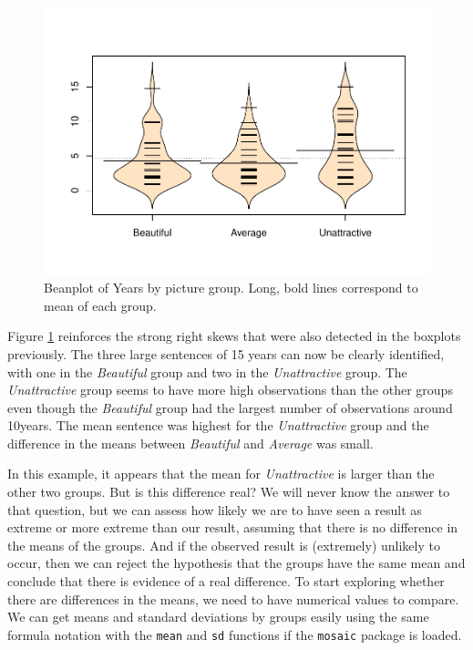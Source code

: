 \documentclass[]{book}
\begin{document}
\begin{figure}[htbp]
\centering
\includegraphics{GreenwoodBanner_files/figure-latex/Figure2-5-1.pdf}
\caption{\label{fig:Figure2-5}Beanplot of Years by picture group. Long, bold lines
correspond to mean of each group.}
\end{figure}

Figure \ref{fig:Figure2-5} reinforces the strong right skews that were
also detected in the boxplots previously. The three large sentences of
15 years can now be clearly identified, with one in the \emph{Beautiful}
group and two in the \emph{Unattractive} group. The \emph{Unattractive}
group seems to have more high observations than the other groups even
though the \emph{Beautiful} group had the largest number of observations
around 10years. The mean sentence was highest for the
\emph{Unattractive} group and the difference in the means between
\emph{Beautiful} and \emph{Average} was small.

In this example, it appears that the mean for \emph{Unattractive} is
larger than the other two groups. But is this difference real? We will
never know the answer to that question, but we can assess how likely we
are to have seen a result as extreme or more extreme than our result,
assuming that there is no difference in the means of the groups. And if
the observed result is (extremely) unlikely to occur, then we can reject
the hypothesis that the groups have the same mean and conclude that
there is evidence of a real difference. To start exploring whether there
are differences in the means, we need to have numerical values to
compare. We can get means and standard deviations by groups easily using
the same formula notation with the \texttt{mean} and \texttt{sd}
functions if the \texttt{mosaic} package is loaded.
\end{document}
